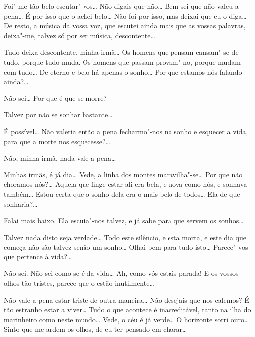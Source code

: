  Foi"-me tão belo escutar"-vos\ldots{} 
Não digais que não\ldots{} Bem
sei que não valeu a pena\ldots{}
É por isso que o achei belo\ldots{} Não foi por
isso, mas deixai que eu o diga\ldots{} 
De resto, a música da vossa voz, que
escutei ainda mais que as vossas palavras,
deixa"-me, talvez só por ser música, descontente\ldots{}

 Tudo deixa descontente,
minha irmã\ldots{} Os homens que pensam
cansam"-se de tudo, porque tudo muda. Os homens que passam
provam"-no, porque mudam com tudo\ldots{} 
De eterno e belo há apenas o sonho\ldots{} 
Por que estamos nós falando ainda?\ldots{}

 Não sei\ldots{}  Por que é que se morre? 

 Talvez por não se sonhar bastante\ldots{}

 É possível\ldots{} Não valeria então a 
pena fecharmo"-nos no
sonho e esquecer a vida, para que a morte nos esquecesse?\ldots{}

 Não, minha irmã, nada vale a pena\ldots{}

 Minhas irmãs, é já dia\ldots{} 
Vede, a linha dos montes
maravilha"-se\ldots{} Por que não
choramos nós?\ldots{} Aquela que finge estar
ali era bela, e nova como nós, e sonhava
também\ldots{} Estou certa que o
sonho dela era o mais belo de todos\ldots{} 
Ela de que sonharia?\ldots{}

 Falai mais baixo. Ela escuta"-nos talvez,
e já sabe para que servem os sonhos\ldots{}

\hfill{} 

 Talvez nada disto seja verdade\ldots{} 
Todo este silêncio, e esta
morta, e este dia que começa não são talvez 
senão um sonho\ldots{} Olhai bem
para tudo isto\ldots{} Parece"-vos que pertence à vida?\ldots{}

 Não sei. Não sei como se é da vida\ldots{}
Ah, como vós estais parada! E os vossos olhos tão tristes,
parece que o estão inutilmente\ldots{}

 Não vale a pena estar triste de outra
maneira\ldots{} Não desejais
que nos calemos? É tão estranho estar a
viver\ldots{} Tudo o que acontece é
inacreditável, tanto na ilha do marinheiro
como neste mundo\ldots{} Vede, o
céu é já verde\ldots{} O horizonte sorri
ouro\ldots{} Sinto que me ardem os
olhos, de eu ter pensado em chorar\ldots{}

